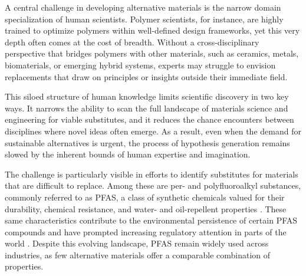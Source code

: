 A central challenge in developing alternative materials is the narrow domain specialization of human scientists. Polymer scientists, for instance, are highly trained to optimize polymers within well-defined design frameworks, yet this very depth often comes at the cost of breadth. Without a cross-disciplinary perspective that bridges polymers with other materials, such as ceramics, metals, biomaterials, or emerging hybrid systems, experts may struggle to envision replacements that draw on principles or insights outside their immediate field. 

This siloed structure of human knowledge limits scientific discovery in two key ways. It narrows the ability to scan the full landscape of materials science and engineering for viable substitutes, and it reduces the chance encounters between disciplines where novel ideas often emerge. As a result, even when the demand for sustainable alternatives is urgent, the process of hypothesis generation remains slowed by the inherent bounds of human expertise and imagination.

The challenge is particularly visible in efforts to identify substitutes for materials that are difficult to replace. Among these are per- and polyfluoroalkyl substances, commonly referred to as PFAS, a class of synthetic chemicals valued for their durability, chemical resistance, and water- and oil-repellent properties \cite{shabanian_durable_2023, leung_physicochemical_2023}. These same characteristics contribute to the environmental persistence of certain PFAS compounds and have prompted increasing regulatory attention in parts of the world \cite{zheng_per-_2021, henderson_analysis_2024, cousins_high_2020}. Despite this evolving landscape, PFAS remain widely used across industries, as few alternative materials offer a comparable combination of properties.

